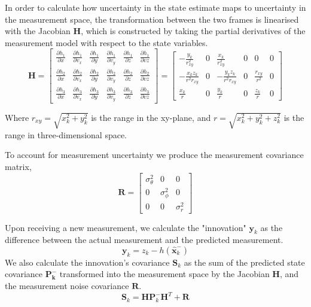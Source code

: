 In order to calculate how uncertainty in the state estimate maps to uncertainty in
the measurement space, the transformation between the two frames is linearised 
with the Jacobian \(\mathbf{H}\), which is constructed by taking the partial 
derivatives of the measurement model with respect to the state variables.
\begin{equation}
    \mathbf{H} = \begin{bmatrix}
    \frac{\partial h_1}{\partial x} & \frac{\partial h_1}{\partial v_x} & \frac{\partial h_1}{\partial y} & \frac{\partial h_1}{\partial v_y} & \frac{\partial h_1}{\partial z} & \frac{\partial h_1}{\partial vz} \\
    \frac{\partial h_2}{\partial x} & \frac{\partial h_2}{\partial v_x} & \frac{\partial h_2}{\partial y} & \frac{\partial h_2}{\partial v_y} & \frac{\partial h_2}{\partial z} & \frac{\partial h_2}{\partial vz} \\
    \frac{\partial h_3}{\partial x} & \frac{\partial h_3}{\partial v_x} & \frac{\partial h_3}{\partial y} & \frac{\partial h_3}{\partial v_y} & \frac{\partial h_3}{\partial z} & \frac{\partial h_3}{\partial vz}
    \end{bmatrix}
    = \begin{bmatrix}
    -\frac{y_k}{r_{xy}^2} & 0 & \frac{x_k}{r_{xy}^2} & 0 & 0 & 0 \\
    -\frac{x_k z_k}{r^2 r_{xy}} & 0 & -\frac{y_k z_k}{r^2 r_{xy}} & 0 & \frac{r_{xy}}{r^2} & 0 \\
    \frac{x_k}{r} & 0 & \frac{y_k}{r} & 0 & \frac{z_k}{r} & 0
    \end{bmatrix}
\end{equation}

Where \(r_{xy} = \sqrt{x_k^2 + y_k^2}\) is the range in the xy-plane, and 
\(r = \sqrt{x_k^2 + y_k^2 + z_k^2}\) is the range in three-dimensional space.

To account for measurement uncertainty we produce the measurement covariance matrix,
\begin{equation}
    \mathbf{R} = \begin{bmatrix}
    \sigma_\theta^2 & 0 & 0 \\
    0 & \sigma_\phi^2 & 0 \\
    0 & 0 & \sigma_r^2
    \end{bmatrix}
\end{equation}

Upon receiving a new measurement, we calculate the "innovation" \(\mathbf{y}_k\) as the 
difference between
the actual measurement and the predicted measurement.  
\begin{equation}
    \mathbf{y}_k = z_k - h(\hat{\mathbf{x}}_k^-)
\end{equation}
We also calculate the innovation's covariance \(\mathbf{S}_k\) as the sum 
of the predicted state covariance \(\mathbf{P^-_k}\) transformed into the measurement space by the 
Jacobian \(\mathbf{H}\), and the measurement noise covariance \(\mathbf{R}\).
\begin{equation}
    \mathbf{S}_k = \mathbf{H} \mathbf{P}_k^- \mathbf{H}^T + \mathbf{R}
\end{equation}

